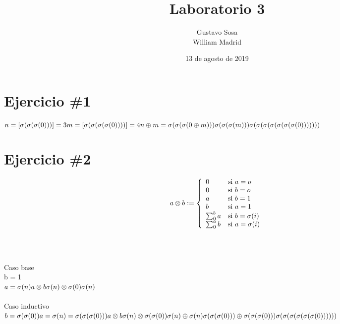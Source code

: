 \documentclass{article}
\title{Laboratorio 3}
\author{Gustavo Sosa \\ William Madrid }
\date{13 de agosto de 2019}
\begin{document}
\maketitle

\section*{Ejercicio \#1}
\begin{math}
n = [\sigma(\sigma(\sigma(0)))] = 3\\
m = [\sigma(\sigma(\sigma(\sigma(0))))] = 4\\
\\
n\oplus m =\\
\sigma(\sigma(\sigma(0\oplus m)))\\
\sigma(\sigma(\sigma(m)))\\
\sigma(\sigma(\sigma(\sigma(\sigma(\sigma(\sigma(0)))))))
\end{math}

\section*{Ejercicio \#2}
\[
a\otimes b := \left\{
 \begin{array}{l l}
            0 & \mbox{si } a=o \\
            0 & \mbox{si } b=o \\
            a & \mbox{si } b=1 \\
            b & \mbox{si } a=1 \\
            \sum_{0}^{b}a & \mbox{si } b=\sigma(i) \\
            \sum_{0}^{a}b & \mbox{si } a=\sigma(i) \\
        \end{array}
        \right.
\]\\
\\
\\
Caso base\\
b = 1\\
\begin{math}
a=\sigma(n)\\
a\otimes b\\
\sigma(n)\otimes \sigma(0)\\
\sigma(n)\\
\end{math}\\
\\
Caso inductivo \\
\begin{math}
b=\sigma(\sigma(0))\\
a=\sigma(n)=\sigma(\sigma(\sigma(0)))\\
\\
a\otimes b\\
\sigma(n)\otimes \sigma(\sigma(0))\\
\sigma(n)\oplus \sigma(n)\\
\sigma(\sigma(\sigma(0)))\oplus \sigma(\sigma(\sigma(0)))\\
\sigma(\sigma(\sigma(\sigma(\sigma(\sigma(0))))))\\
\end{math}
\end{document}
